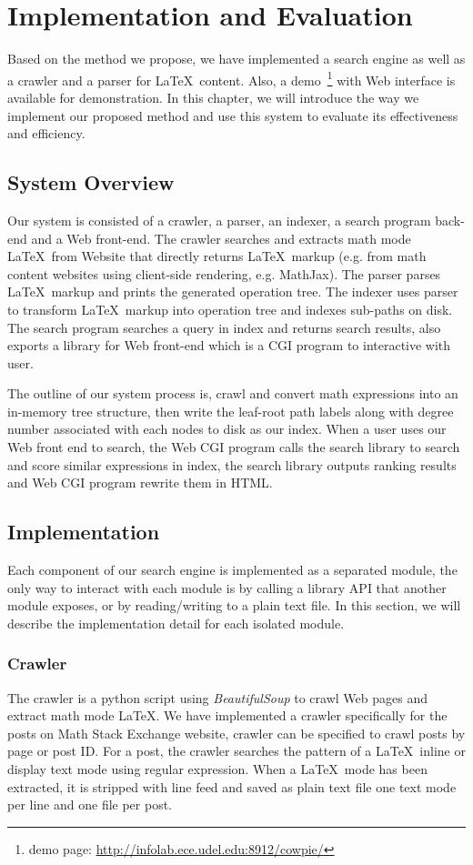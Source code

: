 \chapter{Implementation and Evaluation}
Based on the method we propose, we have implemented a search engine as well as a crawler and a parser for \LaTeX\ content. Also, a demo~\footnote{demo page: \url{http://infolab.ece.udel.edu:8912/cowpie/}} with Web interface is available for demonstration. 
In this chapter, we will introduce the way we implement our proposed method and use this system to evaluate its effectiveness and efficiency.

\section{System Overview}
Our system is consisted of a crawler, a parser, an indexer, a search program back-end and a Web front-end. 
The crawler searches and extracts math mode \LaTeX\ from Website that directly returns \LaTeX\ markup (e.g. from math content websites using client-side rendering, e.g. MathJax). The parser parses \LaTeX\ markup and prints the generated operation tree.
The indexer uses parser to transform \LaTeX\ markup into operation tree and indexes sub-paths on disk. 
The search program searches a query in index and returns search results, also exports a library for Web front-end which is a CGI program to interactive with user. 

The outline of our system process is, crawl and convert math expressions into an in-memory tree structure, then write the leaf-root path labels along with degree number associated with each nodes to disk as our index. 
When a user uses our Web front end to search, the Web CGI program calls the search library to search and score similar expressions in index, the search library outputs ranking results and Web CGI program rewrite them in HTML.

\section{Implementation}
Each component of our search engine is implemented as a separated module, the only way to interact with each module is by calling a library API that another module exposes, or by reading/writing to a plain text file. 
In this section, we will describe the implementation detail for each isolated module.

\subsection{Crawler}
The crawler is a python script using \textit{BeautifulSoup} to crawl Web pages and extract math mode \LaTeX. 
We have implemented a crawler specifically for the posts on Math Stack Exchange website, crawler can be specified to crawl posts by page or post ID.
For a post, the crawler searches the pattern of a \LaTeX\ inline or display text mode using regular expression. 
When a \LaTeX\ mode has been extracted, it is stripped with line feed and saved as plain text file one text mode per line and one file per post.

